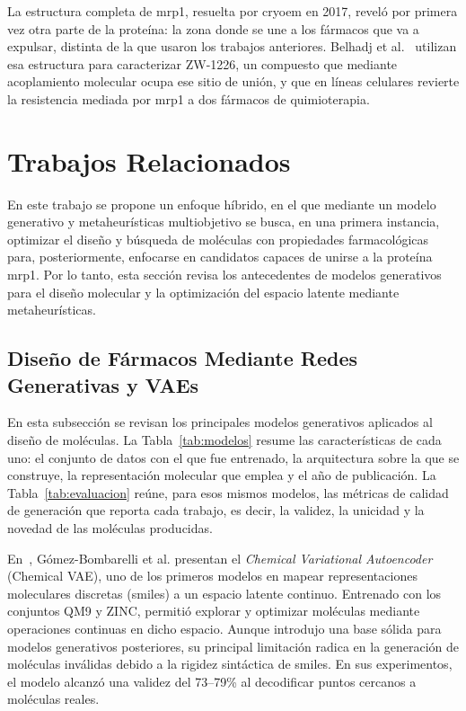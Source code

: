 La estructura completa de \gls{mrp1}, resuelta por \gls{cryoem} en 2017, reveló por primera vez otra parte de la proteína: la zona donde se une a los fármacos que va a expulsar, distinta de la que usaron los trabajos anteriores. Belhadj et al.~\cite{belhadj2024} utilizan esa estructura para caracterizar ZW-1226, un compuesto que mediante acoplamiento molecular ocupa ese sitio de unión, y que en líneas celulares revierte la resistencia mediada por \gls{mrp1} a dos fármacos de quimioterapia.

\section{Trabajos Relacionados}
\label{sec:trabajos_relacionados}

En este trabajo se propone un enfoque híbrido, en el que mediante un modelo generativo y metaheurísticas multiobjetivo se busca, en una primera instancia, optimizar el diseño y búsqueda de moléculas con propiedades farmacológicas para, posteriormente, enfocarse en candidatos capaces de unirse a la proteína \gls{mrp1}. Por lo tanto, esta sección revisa los antecedentes de modelos generativos para el diseño molecular y la optimización del espacio latente mediante metaheurísticas.

\subsection{Diseño de Fármacos Mediante Redes Generativas y VAEs}
\label{subsec:art_vaes}

En esta subsección se revisan los principales modelos generativos aplicados al diseño de moléculas. La Tabla~\ref{tab:modelos} resume las características de cada uno: el conjunto de datos con el que fue entrenado, la arquitectura sobre la que se construye, la representación molecular que emplea y el año de publicación. La Tabla~\ref{tab:evaluacion} reúne, para esos mismos modelos, las métricas de calidad de generación que reporta cada trabajo, es decir, la validez, la unicidad y la novedad de las moléculas producidas.





En~\cite{GBWHLDSA18}, Gómez-Bombarelli et al. presentan el \textit{Chemical Variational Autoencoder} (Chemical VAE), uno de los primeros modelos en mapear representaciones moleculares discretas (\gls{smiles}) a un espacio latente continuo. Entrenado con los conjuntos QM9 y ZINC, permitió explorar y optimizar moléculas mediante operaciones continuas en dicho espacio. Aunque introdujo una base sólida para modelos generativos posteriores, su principal limitación radica en la generación de moléculas inválidas debido a la rigidez sintáctica de \gls{smiles}. En sus experimentos, el modelo alcanzó una validez del 73--79\% al decodificar puntos cercanos a moléculas reales.

